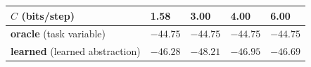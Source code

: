\documentclass[11pt]{article}
\begin{document}
\begin{longtable}[]{@{}lllll@{}}
\toprule
\begin{minipage}[b]{0.17\columnwidth}\raggedright
\(C\) (bits/step)\strut
\end{minipage} & \begin{minipage}[b]{0.17\columnwidth}\raggedright
1.58\strut
\end{minipage} & \begin{minipage}[b]{0.17\columnwidth}\raggedright
3.00\strut
\end{minipage} & \begin{minipage}[b]{0.17\columnwidth}\raggedright
4.00\strut
\end{minipage} & \begin{minipage}[b]{0.17\columnwidth}\raggedright
6.00\strut
\end{minipage}\tabularnewline
\midrule
\endhead
\begin{minipage}[t]{0.17\columnwidth}\raggedright
\textbf{oracle} (task variable)\strut
\end{minipage} & \begin{minipage}[t]{0.17\columnwidth}\raggedright
\(\mathbf{-44.75}\)\strut
\end{minipage} & \begin{minipage}[t]{0.17\columnwidth}\raggedright
\(-44.75\)\strut
\end{minipage} & \begin{minipage}[t]{0.17\columnwidth}\raggedright
\(-44.75\)\strut
\end{minipage} & \begin{minipage}[t]{0.17\columnwidth}\raggedright
\(-44.75\)\strut
\end{minipage}\tabularnewline
\begin{minipage}[t]{0.17\columnwidth}\raggedright
\textbf{learned} (learned abstraction)\strut
\end{minipage} & \begin{minipage}[t]{0.17\columnwidth}\raggedright
\(-46.28\)\strut
\end{minipage} & \begin{minipage}[t]{0.17\columnwidth}\raggedright
\(-48.21\)\strut
\end{minipage} & \begin{minipage}[t]{0.17\columnwidth}\raggedright
\(-46.95\)\strut
\end{minipage} & \begin{minipage}[t]{0.17\columnwidth}\raggedright
\(-46.69\)\strut
\end{minipage}\tabularnewline

\end{longtable}
\end{document}
